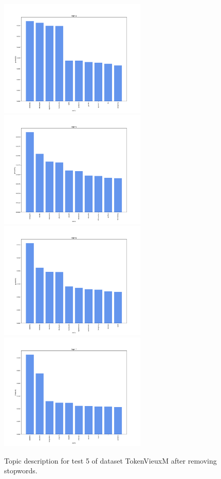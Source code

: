 \documentclass[10pt]{article} %
\begin{document}
\begin{figure}[H]
		\includegraphics[width=7cm]{images/plots/test_5_no_stopwords/topic_4.png}
		\includegraphics[width=7cm]{images/plots/test_5_no_stopwords/topic_5.png}
		\includegraphics[width=7cm]{images/plots/test_5_no_stopwords/topic_6.png}
		\includegraphics[width=7cm]{images/plots/test_5_no_stopwords/topic_7.png}
	\caption{Topic description for test 5 of dataset TokenVieuxM after removing stopwords.}
\end{figure}
	
\end{document}
